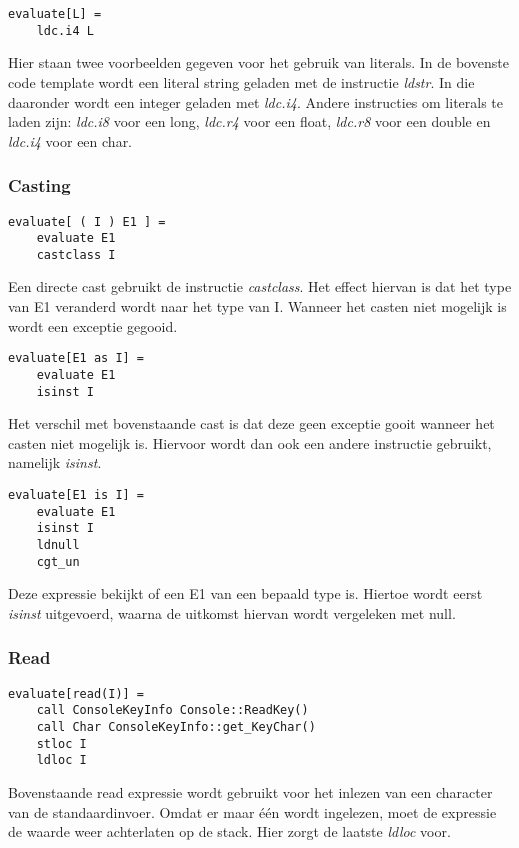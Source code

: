 \begin{lstlisting}
evaluate[L] =
	ldc.i4 L
\end{lstlisting}
Hier staan twee voorbeelden gegeven voor het gebruik van literals. In de bovenste code template wordt een literal string geladen met de instructie \textit{ldstr}. In die daaronder wordt een integer geladen met \textit{ldc.i4}. Andere instructies om literals te laden zijn: \textit{ldc.i8} voor een long, \textit{ldc.r4} voor een float, \textit{ldc.r8} voor een double en \textit{ldc.i4} voor een char.

\subsubsection{Casting}
\begin{lstlisting}
evaluate[ ( I ) E1 ] =
	evaluate E1
	castclass I
\end{lstlisting}
Een directe cast gebruikt de instructie \textit{castclass}. Het effect hiervan is dat het type van E1 veranderd wordt naar het type van I. Wanneer het casten niet mogelijk is wordt een exceptie gegooid.

\begin{lstlisting}
evaluate[E1 as I] =
	evaluate E1
	isinst I
\end{lstlisting}
Het verschil met bovenstaande cast is dat deze geen exceptie gooit wanneer het casten niet mogelijk is. Hiervoor wordt dan ook een andere instructie gebruikt, namelijk \textit{isinst}.

\begin{lstlisting}
evaluate[E1 is I] =
	evaluate E1
	isinst I
	ldnull
	cgt_un
\end{lstlisting}
Deze expressie bekijkt of een E1 van een bepaald type is. Hiertoe wordt eerst \textit{isinst} uitgevoerd, waarna de uitkomst hiervan wordt vergeleken met null.

\subsubsection{Read}
\begin{lstlisting}
evaluate[read(I)] =
	call ConsoleKeyInfo Console::ReadKey()
	call Char ConsoleKeyInfo::get_KeyChar()
	stloc I
	ldloc I
\end{lstlisting}
Bovenstaande read expressie wordt gebruikt voor het inlezen van een character van de standaardinvoer. Omdat er maar \'e\'en wordt ingelezen, moet de expressie de waarde weer achterlaten op de stack. Hier zorgt de laatste \textit{ldloc} voor.

